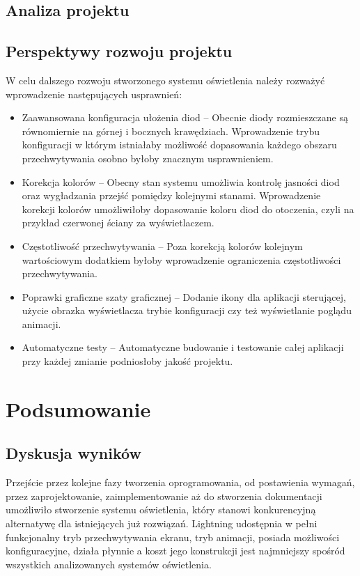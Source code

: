 \documentclass[12pt]{report}
\begin{document}

\section{Analiza projektu}


\section{Perspektywy rozwoju projektu} \label{prp}

W celu dalszego rozwoju stworzonego systemu oświetlenia należy rozważyć wprowadzenie następujących usprawnień:

\begin{itemize}
	\item Zaawansowana konfiguracja ułożenia diod -- Obecnie diody rozmieszczane są równomiernie na górnej i bocznych krawędziach. Wprowadzenie trybu konfiguracji w którym istniałaby możliwość dopasowania każdego obszaru przechwytywania osobno byłoby znacznym usprawnieniem.
	\item Korekcja kolorów -- Obecny stan systemu umożliwia kontrolę jasności diod oraz wygładzania przejść pomiędzy kolejnymi stanami. Wprowadzenie korekcji kolorów umożliwiłoby dopasowanie koloru diod do otoczenia, czyli na przykład czerwonej ściany za wyświetlaczem.
	\item Częstotliwość przechwytywania -- Poza korekcją kolorów kolejnym wartościowym dodatkiem byłoby wprowadzenie ograniczenia częstotliwości przechwytywania.
	\item Poprawki graficzne szaty graficznej -- Dodanie ikony dla aplikacji sterującej, użycie obrazka wyświetlacza trybie konfiguracji czy też wyświetlanie poglądu animacji.
	\item Automatyczne testy -- Automatyczne budowanie i testowanie całej aplikacji przy każdej zmianie podniosłoby jakość projektu. 
\end{itemize}

\chapter{Podsumowanie}

\section{Dyskusja wyników}

Przejście przez kolejne fazy tworzenia oprogramowania, od postawienia wymagań, przez zaprojektowanie, zaimplementowanie aż do stworzenia dokumentacji umożliwiło stworzenie systemu oświetlenia, który stanowi konkurencyjną alternatywę dla istniejących już rozwiązań.  Lightning udostępnia w pełni funkcjonalny tryb przechwytywania ekranu, tryb animacji, posiada możliwości konfiguracyjne, działa płynnie a koszt jego konstrukcji jest najmniejszy spośród wszystkich analizowanych systemów oświetlenia.
\end{document}
